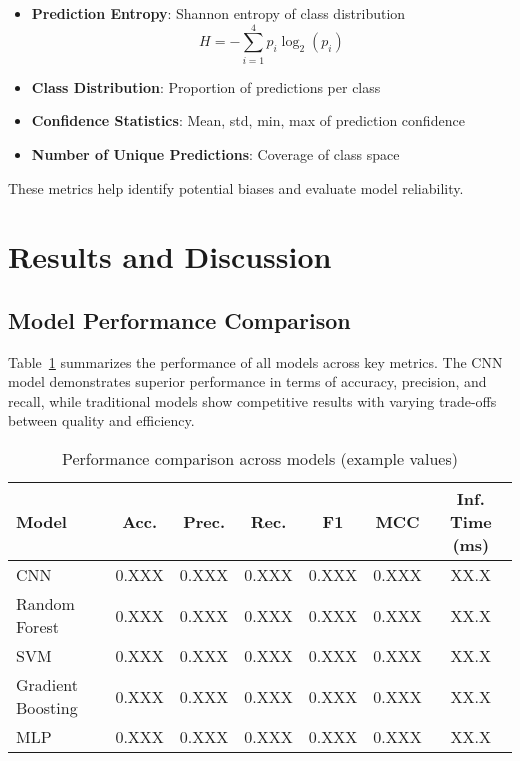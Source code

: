 \documentclass[runningheads]{llncs}
\begin{document}
\begin{itemize}
    \item \textbf{Prediction Entropy}: Shannon entropy of class distribution
    $$H = -\sum_{i=1}^{4} p_i \log_2(p_i)$$
    \item \textbf{Class Distribution}: Proportion of predictions per class
    \item \textbf{Confidence Statistics}: Mean, std, min, max of prediction confidence
    \item \textbf{Number of Unique Predictions}: Coverage of class space
\end{itemize}

These metrics help identify potential biases and evaluate model reliability.

\section{Results and Discussion}

\subsection{Model Performance Comparison}

Table~\ref{tab:results} summarizes the performance of all models across key metrics. The CNN model demonstrates superior performance in terms of accuracy, precision, and recall, while traditional models show competitive results with varying trade-offs between quality and efficiency.

\begin{table}[h]
\centering
\caption{Performance comparison across models (example values)}
\label{tab:results}
\begin{tabular}{@{}lcccccc@{}}
\toprule
\textbf{Model} & \textbf{Acc.} & \textbf{Prec.} & \textbf{Rec.} & \textbf{F1} & \textbf{MCC} & \textbf{Inf. Time (ms)} \\
\midrule
CNN & 0.XXX & 0.XXX & 0.XXX & 0.XXX & 0.XXX & XX.X \\
Random Forest & 0.XXX & 0.XXX & 0.XXX & 0.XXX & 0.XXX & XX.X \\
SVM & 0.XXX & 0.XXX & 0.XXX & 0.XXX & 0.XXX & XX.X \\
Gradient Boosting & 0.XXX & 0.XXX & 0.XXX & 0.XXX & 0.XXX & XX.X \\
MLP & 0.XXX & 0.XXX & 0.XXX & 0.XXX & 0.XXX & XX.X \\
\bottomrule
\end{tabular}
\end{table}
\end{document}
